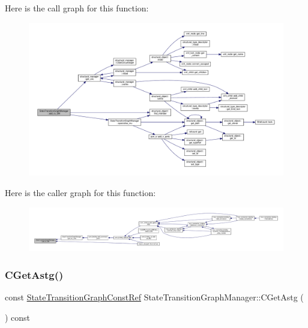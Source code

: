 Here is the call graph for this function\+:
\nopagebreak
\begin{figure}[H]
\begin{center}
\leavevmode
\includegraphics[width=350pt]{d9/dfd/classStateTransitionGraphManager_a93645ec1387a4b918e01ee4eeec5c658_cgraph}
\end{center}
\end{figure}
Here is the caller graph for this function\+:
\nopagebreak
\begin{figure}[H]
\begin{center}
\leavevmode
\includegraphics[width=350pt]{d9/dfd/classStateTransitionGraphManager_a93645ec1387a4b918e01ee4eeec5c658_icgraph}
\end{center}
\end{figure}
\mbox{\label{classStateTransitionGraphManager_acfc0d7f26c027841313d410893d4fddc}} 
\subsubsection{\texorpdfstring{C\+Get\+Astg()}{CGetAstg()}}
{\footnotesize\ttfamily const \hyperlink{state__transition__graph_8hpp_aa722f3ba42caaaafcacdec07925f6b06}{State\+Transition\+Graph\+Const\+Ref} State\+Transition\+Graph\+Manager\+::\+C\+Get\+Astg (\begin{DoxyParamCaption}{ }\end{DoxyParamCaption}) const}



